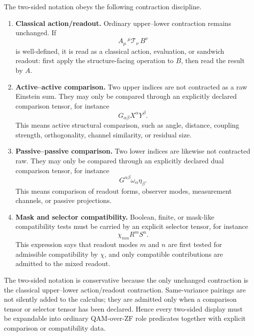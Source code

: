\begin{definition}\label{def:two-sided-admissible-contractions}
The two-sided notation obeys the following contraction discipline.
\begin{enumerate}[leftmargin=2em]
  \item \textbf{Classical action/readout.} Ordinary upper--lower contraction remains unchanged.  If
  \[
  A_\mu\,{}^\mu\mathcal{T}_\nu\,B^\nu
  \]
  is well-defined, it is read as a classical action, evaluation, or sandwich readout: first apply the structure-facing operation to \(B\), then read the result by \(A\).
  \item \textbf{Active--active comparison.} Two upper indices are not contracted as a raw Einstein sum.  They may only be compared through an explicitly declared comparison tensor, for instance
  \[
  G_{\alpha\beta}X^\alpha Y^\beta .
  \]
  This means active structural comparison, such as angle, distance, coupling strength, orthogonality, channel similarity, or residual size.
  \item \textbf{Passive--passive comparison.} Two lower indices are likewise not contracted raw.  They may only be compared through an explicitly declared dual comparison tensor, for instance
  \[
  G^{\alpha\beta}\omega_\alpha\eta_\beta .
  \]
  This means comparison of readout forms, observer modes, measurement channels, or passive projections.
  \item \textbf{Mask and selector compatibility.} Boolean, finite, or mask-like compatibility tests must be carried by an explicit selector tensor, for instance
  \[
  \chi_{mn}R^mS^n .
  \]
  This expression says that readout modes \(m\) and \(n\) are first tested for admissible compatibility by \(\chi\), and only compatible contributions are admitted to the mixed readout.
\end{enumerate}
\end{definition}

\begin{remark}\label{rem:two-sided-conservative-reading-rule}
The two-sided notation is conservative because the only unchanged contraction is the classical upper--lower action/readout contraction.  Same-variance pairings are not silently added to the calculus; they are admitted only when a comparison tensor or selector tensor has been declared.  Hence every two-sided display must be expandable into ordinary QAM-over-ZF role predicates together with explicit comparison or compatibility data.
\end{remark}


